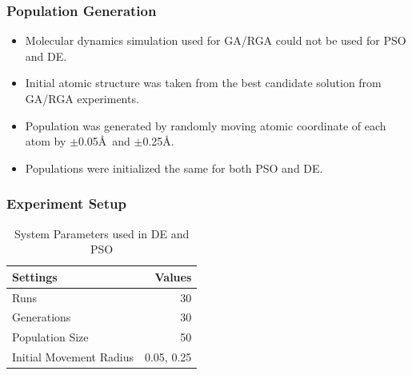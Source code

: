 \documentclass[10pt]{beamer}
\begin{document}
\begin{frame}
	\frametitle{Population Generation}

	\begin{itemize}
		\item Molecular dynamics simulation used for GA/RGA could not be used for PSO and DE.
		\item Initial atomic structure was taken from the best candidate solution from GA/RGA experiments.
		\item Population was generated by randomly moving atomic coordinate of each atom by $\pm$0.05\AA\ and $\pm$0.25\AA.
		\item Populations were initialized the same for both PSO and DE.
	\end{itemize}

\end{frame}

\begin{frame}
	\frametitle{Experiment Setup}

	\begin{table}
		\begin{tabular}{ | l | r | }
		  \hline
			Settings & Values \\ \hline \hline
			Runs & 30 \\ \hline
			Generations & 30 \\ \hline
			Population Size & 50 \\ \hline
			Initial Movement Radius & 0.05, 0.25 \\ \hline
		\end{tabular}
		\caption{System Parameters used in DE and PSO}
	\end{table}

\end{frame}
\end{document}
